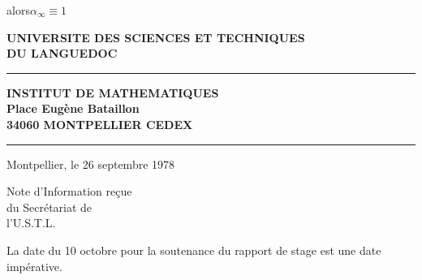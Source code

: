 alors\quad $\alpha_\infty\equiv1$





\begin{flushleft}
\textbf{UNIVERSITE DES SCIENCES ET TECHNIQUES}\\
\textbf{DU LANGUEDOC}

\rule{.6cm}{.3pt}

\textbf{INSTITUT DE MATHEMATIQUES}\\
\textbf{Place Eugène Bataillon}\\
\textbf{34060 MONTPELLIER CEDEX}

\rule{.8cm}{.3pt}
\end{flushleft}

\begin{flushright}
Montpellier, le 26 septembre 1978

Note d'Information reçue\\
du Secrétariat de\\
l'U.S.T.L.
\end{flushright}

La date du 10 octobre pour la soutenance du rapport de stage est une date impérative.

